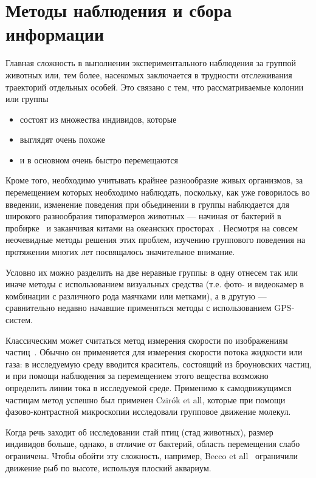 \section{Методы наблюдения и сбора информации} %
\label{sec:ExperimentalMethods}
	Главная сложность в выполнении экспериментального наблюдения за группой животных или, тем более, насекомых заключается в трудности отслеживания траекторий отдельных особей. Это связано с тем, что рассматриваемые колонии или группы
	\begin{itemize}
		\item  состоят из множества индивидов, которые
		\item выглядят очень похоже
		\item и в основном очень быстро перемещаются
	\end{itemize}
	Кроме того, необходимо учитывать крайнее разнообразие живых организмов, за перемещением которых необходимо наблюдать, поскольку, как уже говорилось во введении, изменение поведения при обьединении в группы наблюдается для широкого разнообразия типоразмеров животных --- начиная от бактерий в пробирке~\cite{csahok1997,keller1971} и заканчивая китами на океанских просторах~\cite{makris2009}.
	Несмотря на совсем неочевидные методы решения этих проблем, изучению группового поведения на протяжении многих лет посвящалось значительное внимание.

	Условно их можно разделить на две неравные группы: в одну отнесем так или иначе методы с использованием визуальных средства (т.е. фото- и видеокамер в комбинации с различного рода маячками или метками), а в другую --- сравнительно недавно начавшие применяться методы с использованием GPS-систем.

	Классическим может считаться метод измерения скорости по изображениям частиц~\cite{raffel2007}. Обычно он применяется для измерения скорости потока жидкости или газа: в исследуемую среду вводится краситель, состоящий из броуновских частиц, и при помощи наблюдения за перемещением этого вещества возможно определить линии тока в исследуемой среде. Применимо к самодвижущимся частицам метод успешно был применен Czir\'{o}k  et all\cite{csahok1997}, которые при помощи фазово-контрастной микроскопии исследовали групповое движение молекул.

	Когда речь заходит об исследовании стай птиц (стад животных), размер индивидов больше, однако, в отличие от бактерий, область перемещения слабо ограничена. Чтобы обойти эту сложность, например, Becco et all~\cite{becco2006} ограничили движение рыб по высоте, используя плоский аквариум.

